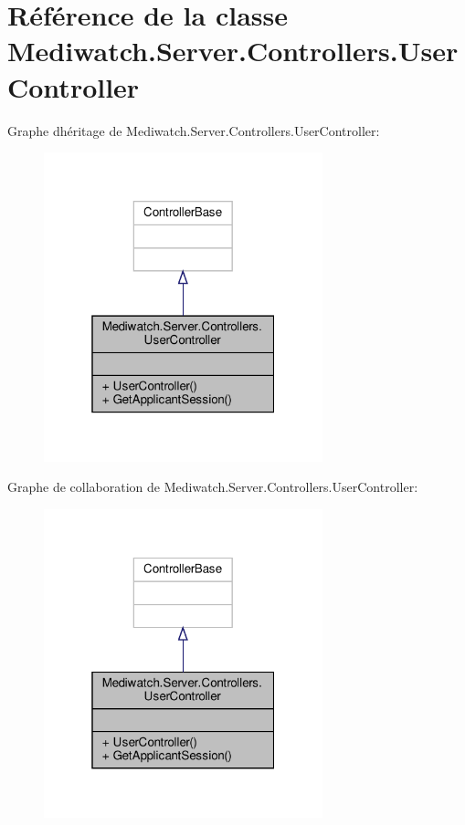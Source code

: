 \hypertarget{class_mediwatch_1_1_server_1_1_controllers_1_1_user_controller}{}\section{Référence de la classe Mediwatch.\+Server.\+Controllers.\+User\+Controller}
\label{class_mediwatch_1_1_server_1_1_controllers_1_1_user_controller}


Graphe d\textquotesingle{}héritage de Mediwatch.\+Server.\+Controllers.\+User\+Controller\+:\nopagebreak
\begin{figure}[H]
\begin{center}
\leavevmode
\includegraphics[width=229pt]{class_mediwatch_1_1_server_1_1_controllers_1_1_user_controller__inherit__graph}
\end{center}
\end{figure}


Graphe de collaboration de Mediwatch.\+Server.\+Controllers.\+User\+Controller\+:\nopagebreak
\begin{figure}[H]
\begin{center}
\leavevmode
\includegraphics[width=229pt]{class_mediwatch_1_1_server_1_1_controllers_1_1_user_controller__coll__graph}
\end{center}
\end{figure}
